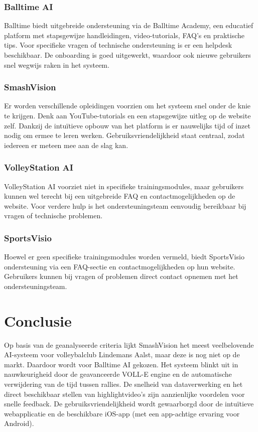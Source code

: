\subsubsection{Balltime AI}
Balltime biedt uitgebreide ondersteuning via de Balltime Academy, een educatief platform met stapsgewijze handleidingen, video-tutorials, FAQ’s en praktische tips. Voor specifieke vragen of technische ondersteuning is er een helpdesk beschikbaar. De onboarding is goed uitgewerkt, waardoor ook nieuwe gebruikers snel wegwijs raken in het systeem.
\subsubsection{SmashVision}
Er worden verschillende opleidingen voorzien om het systeem snel onder de knie te krijgen. Denk aan YouTube-tutorials en een stapsgewijze uitleg op de website zelf. Dankzij de intuïtieve opbouw van het platform is er nauwelijks tijd of inzet nodig om ermee te leren werken. Gebruiksvriendelijkheid staat centraal, zodat iedereen er meteen mee aan de slag kan.
\subsubsection{VolleyStation AI}
VolleyStation AI voorziet niet in specifieke trainingsmodules, maar gebruikers kunnen wel terecht bij een uitgebreide FAQ en contactmogelijkheden op de website. Voor verdere hulp is het ondersteuningsteam eenvoudig bereikbaar bij vragen of technische problemen.
\subsubsection{SportsVisio}
Hoewel er geen specifieke trainingsmodules worden vermeld, biedt SportsVisio ondersteuning via een FAQ-sectie en contactmogelijkheden op hun website. Gebruikers kunnen bij vragen of problemen direct contact opnemen met het ondersteuningsteam.

\section{Conclusie}
Op basis van de geanalyseerde criteria lijkt SmashVision het meest veelbelovende AI-systeem voor volleybalclub Lindemans Aalst, maar deze is nog niet op de markt. Daardoor wordt voor Balltime AI gekozen. Het systeem blinkt uit in nauwkeurigheid door de geavanceerde VOLL-E engine en de automatische verwijdering van de tijd tussen rallies. De snelheid van dataverwerking en het direct beschikbaar stellen van highlightvideo's zijn aanzienlijke voordelen voor snelle feedback. De gebruiksvriendelijkheid wordt gewaarborgd door de intuïtieve webapplicatie en de beschikbare iOS-app (met een app-achtige ervaring voor Android).

